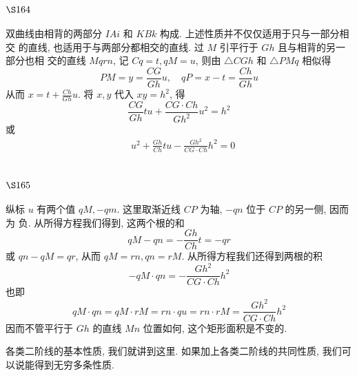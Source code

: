 \section{$\S 164$}

双曲线由相背的两部分 $I A i$ 和 $K B k$ 构成. 上述性质并不仅仅适用于只与一部分相交 的直线, 也适用于与两部分都相交的直线. 过 $M$ 引平行于 $G h$ 且与相背的另一部分也相 交的直线 $M q r n$, 记 $C q=t, q M=u$, 则由 $\triangle C G h$ 和 $\triangle P M q$ 相似得
\[
P M=y=\frac{C G}{G h} u, \quad q P=x-t=\frac{C h}{G h} u
\]
从而 $x=t+\frac{C h}{G h} u$. 将 $x, y$ 代入 $x y=h^{2}$, 得
\[
\frac{C G}{G h} t u+\frac{C G \cdot C h}{G h^{2}} u^{2}=h^{2}
\]
或 
\[
\begin{aligned}
& u^{2}+\frac{G h}{C h} t u-\frac{G h^{2}}{C G \cdot C h} h^{2}=0
\end{aligned}
\]
\section{$\S 165$}

纵标 $u$ 有两个值 $q M,-q m$. 这里取渐近线 $C P$ 为轴, $-q n$ 位于 $C P$ 的另一侧, 因而为 负. 从所得方程我们得到, 这两个根的和
\[
q M-q n=-\frac{G h}{C h} t=-q r
\]
或 $q n-q M=q r$, 从而 $q M=r n, q n=r M$. 从所得方程我们还得到两根的积
\[
-q M \cdot q n=-\frac{G h^{2}}{C G \cdot C h} h^{2}
\]
也即
\[
q M \cdot q n=q M \cdot r M=r n \cdot q u=r n \cdot r M=\frac{G h^{2}}{C G \cdot C h} h^{2}
\]
因而不管平行于 $G h$ 的直线 $M n$ 位置如何, 这个矩形面积是不变的.

各类二阶线的基本性质, 我们就讲到这里. 如果加上各类二阶线的共同性质, 我们可 以说能得到无穷多条性质.

